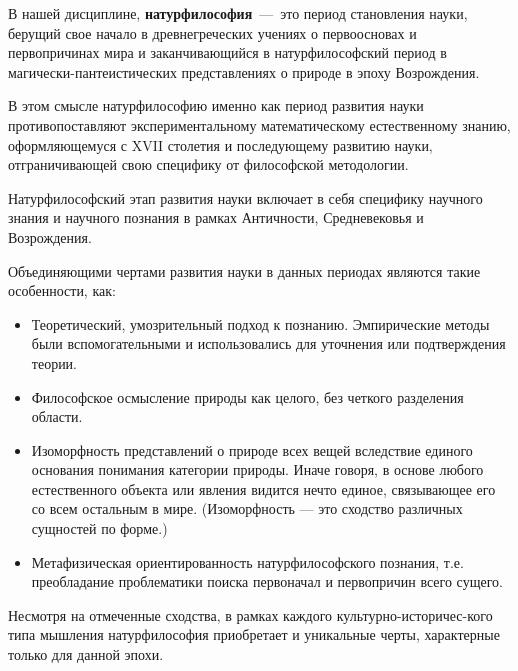 В нашей дисциплине, \textbf{натурфилософия}~---~это период становления науки, берущий свое начало в древнегреческих учениях о первоосновах и первопричинах мира и заканчивающийся в натурфилософский период в магически-пантеистических представлениях о природе в эпоху Возрождения. 

В этом смысле натурфилософию именно как период развития науки противопоставляют
экспериментальному математическому естественному знанию, оформляющемуся с XVII
столетия и последующему развитию науки, отграничивающей свою специфику от
философской методологии. 


Натурфилософский этап развития науки включает в себя специфику научного знания и научного познания в рамках Античности, Средневековья и Возрождения. 

Объединяющими чертами развития науки в данных периодах являются такие особенности, как:

\begin{itemize}
    \item Теоретический, умозрительный подход к познанию. Эмпирические методы были вспомогательными и использовались для уточнения или подтверждения теории.
    \item Философское осмысление природы как целого, без четкого разделения области.
    \item Изоморфность представлений о природе всех вещей вследствие единого основания понимания категории природы. Иначе говоря, в основе любого естественного объекта или явления видится нечто единое, связывающее его со всем остальным в мире. (Изоморфность --- это сходство различных сущностей по форме.)
    \item Метафизическая ориентированность натурфилософского познания, т.е. преобладание проблематики поиска первоначал и первопричин всего сущего.
\end{itemize}


Несмотря на отмеченные сходства, в рамках каждого культурно-историчес-кого типа мышления натурфилософия приобретает и уникальные черты, характерные только для данной эпохи. 

